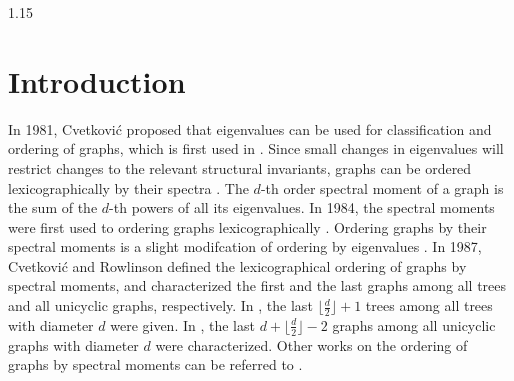 \documentclass[preprint,12pt]{elsarticle1}
\numberwithin{equation}{section}
\begin{document}
\begin{spacing}{1.15}
\section{Introduction}
In 1981, Cvetkovi{\'c} \cite{0Some} proposed that eigenvalues can be used for classification and ordering of graphs, which is first used in \cite{firstordergraph}.
Since small changes in eigenvalues will restrict changes to the relevant structural invariants, graphs can be ordered lexicographically by their spectra \cite{cvetkovic2009introduction}.
The $d$-th order spectral moment of a graph is the sum of the $d$-th powers of all its eigenvalues.
In 1984, the spectral moments were first used to ordering graphs lexicographically \cite{sixvertices}.
Ordering graphs by their spectral moments is a slight modifcation of ordering by eigenvalues \cite{sixvertices}.
In 1987, Cvetkovi{\'c} and Rowlinson \cite{Drago1987Spectra} defined the lexicographical ordering of graphs by spectral moments, and characterized the first and the last graphs among all trees and all unicyclic graphs, respectively.
In \cite{WOS:000283893700001}, the last $\lfloor\frac{d}{2}\rfloor+1$ trees among all trees with diameter $d$ were given.
In \cite{diameter}, the last $d+\lfloor\frac{d}{2}\rfloor-2$ graphs among all unicyclic graphs with diameter $d$ were characterized.
Other works on the ordering of graphs by spectral moments can be referred to \cite{WOS:000301826900014,WOS:000486390400051,tree,WOS:000446809500027}.


\end{spacing}
\end{document}
